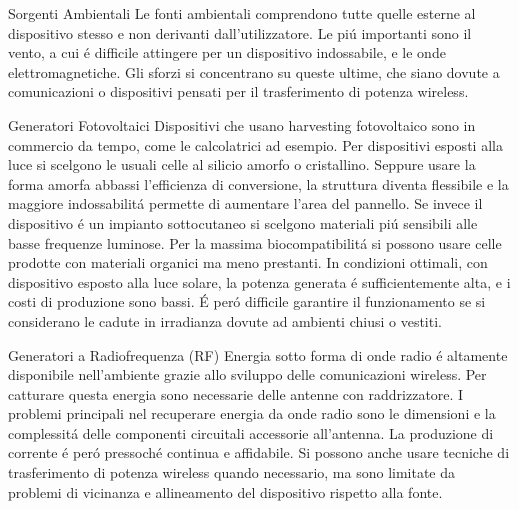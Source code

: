 \begin{section}{Sorgenti Ambientali}
    Le fonti ambientali comprendono tutte quelle esterne al dispositivo stesso e non derivanti dall'utilizzatore. Le pi\'u importanti sono il vento, a cui \'e difficile attingere per un dispositivo indossabile, e le onde elettromagnetiche. Gli sforzi si concentrano su queste ultime, che siano dovute a comunicazioni o dispositivi pensati per il trasferimento di potenza wireless.

    \begin{subsection}{Generatori Fotovoltaici}
    Dispositivi che usano harvesting fotovoltaico sono in commercio da tempo, come le calcolatrici ad esempio. Per dispositivi esposti alla luce si scelgono le usuali celle al silicio amorfo o cristallino. Seppure usare la forma amorfa abbassi l'efficienza di conversione, la struttura diventa flessibile e la maggiore indossabilit\'a permette di aumentare l'area del pannello. Se invece il dispositivo \'e un impianto sottocutaneo si scelgono materiali pi\'u sensibili alle basse frequenze luminose. Per la massima biocompatibilit\'a si possono usare celle prodotte con materiali organici ma meno prestanti. In condizioni ottimali, con dispositivo esposto alla luce solare, la potenza generata \'e sufficientemente alta, e i costi di produzione sono bassi. \'E per\'o difficile garantire il funzionamento se si considerano le cadute in irradianza dovute ad ambienti chiusi o vestiti.
    \end{subsection}

    \begin{subsection}{Generatori a Radiofrequenza (RF)}
    Energia sotto forma di onde radio \'e altamente disponibile nell'ambiente grazie allo sviluppo delle comunicazioni wireless. Per catturare questa energia sono necessarie delle antenne con raddrizzatore. I problemi principali nel recuperare energia da onde radio sono le dimensioni e la complessit\'a delle componenti circuitali accessorie all'antenna. La produzione di corrente \'e per\'o pressoch\'e continua e affidabile. Si possono anche usare tecniche di trasferimento di potenza wireless quando necessario, ma sono limitate da problemi di vicinanza e allineamento del dispositivo rispetto alla fonte. 
    \end{subsection}
\end{section}

